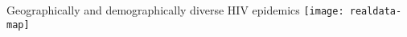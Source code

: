 \begin{frame}{Geographically and demographically diverse HIV epidemics}
  \texttt{[image: realdata-map]}
\end{frame}
